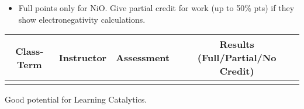 \begin{rubric}

\begin{itemize}
	\item Full points only for NiO. Give partial credit for work (up to 50\% pts) if they show electronegativity calculations.
\end{itemize}

\end{rubric}

\begin{outcomes}
	\begin{center}
		\begin{tabular}{cccc}
			\hline\hline
                Class-Term & Instructor & Assessment & Results (Full/Partial/No Credit) \\
			\hline
                 &  &  &  \\
			\hline
		\end{tabular}
	\end{center}
\end{outcomes}

\begin{comments}

Good potential for Learning Catalytics.
	
\end{comments}